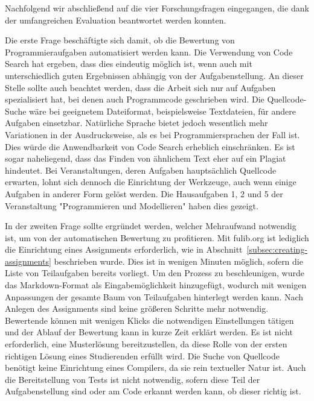 Nachfolgend wir abschließend auf die vier Forschungsfragen eingegangen, die dank der umfangreichen Evaluation beantwortet werden konnten.

Die erste Frage beschäftigte sich damit, ob die Bewertung von Programmieraufgaben automatisiert werden kann.
Die Verwendung von Code Search hat ergeben, dass dies eindeutig möglich ist, wenn auch mit unterschiedlich guten Ergebnissen abhängig von der Aufgabenstellung.
An dieser Stelle sollte auch beachtet werden, dass die Arbeit sich nur auf Aufgaben spezialisiert hat, bei denen auch Programmcode geschrieben wird.
Die Quellcode-Suche wäre bei geeignetem Dateiformat, beispielsweise Textdateien, für andere Aufgaben einsetzbar.
Natürliche Sprache bietet jedoch wesentlich mehr Variationen in der Ausdrucksweise, als es bei Programmiersprachen der Fall ist.
Dies würde die Anwendbarkeit von Code Search erheblich einschränken.
Es ist sogar naheliegend, dass das Finden von ähnlichem Text eher auf ein Plagiat hindeutet.
Bei Veranstaltungen, deren Aufgaben hauptsächlich Quellcode erwarten, lohnt sich dennoch die Einrichtung der Werkzeuge, auch wenn einige Aufgaben in anderer Form gelöst werden.
Die Hausaufgaben 1, 2 und 5 der Veranstaltung "Programmieren und Modellieren" haben dies gezeigt.

In der zweiten Frage sollte ergründet werden, welcher Mehraufwand notwendig ist, um von der automatischen Bewertung zu profitieren.
Mit fulib.org ist lediglich die Einrichtung eines Assignments erforderlich, wie in Abschnitt~\ref{subsec:creating-assignments} beschrieben wurde.
Dies ist in wenigen Minuten möglich, sofern die Liste von Teilaufgaben bereits vorliegt.
Um den Prozess zu beschleunigen, wurde das Markdown-Format als Eingabemöglichkeit hinzugefügt, wodurch mit wenigen Anpassungen der gesamte Baum von Teilaufgaben hinterlegt werden kann.
Nach Anlegen des Assignments sind keine größeren Schritte mehr notwendig.
Bewertende können mit wenigen Klicks die notwendigen Einstellungen tätigen und der Ablauf der Bewertung kann in kurze Zeit erklärt werden.
Es ist nicht erforderlich, eine Musterlösung bereitzustellen, da diese Rolle von der ersten richtigen Lösung eines Studierenden erfüllt wird.
Die Suche von Quellcode benötigt keine Einrichtung eines Compilers, da sie rein textueller Natur ist.
Auch die Bereitstellung von Tests ist nicht notwendig, sofern diese Teil der Aufgabenstellung sind oder am Code erkannt werden kann, ob dieser richtig ist.

